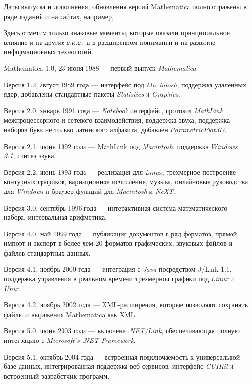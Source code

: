 Даты выпуска и дополнения, обновления версий Mathematica полно отражены в ряде изданий и на сайтах, например, .

Здесь отметим только знаковые моменты, которые оказали принципиальное влияние и на другие \textit{с.к.а.}, а в расширенном понимании и на развитие информационных технологий.
\begin{textitemize}
	\item Mathematica 1.0, 23 июня 1988 --- первый выпуск \textit{Mathematica}.
	\item Версия 1.2, август 1989 года --- интерфейс под \textit{Macintosh}, поддержка удаленных ядер, добавлены стандартные пакеты \textit{Statistics} и \textit{Graphics}.
	\item Версия 2.0, январь 1991 года --- \textit{Notebook} интерфейс, протокол \textit{MathLink} межпроцессорного и сетевого взаимодействия, поддержка звука, поддержка наборов букв не только латинского алфавита, добавлен \textit{ParametricPlot3D}.
	\item Версия 2.1, июнь 1992 года --- MathLink под \textit{Macintosh}, поддержка \textit{Windows 3.1}, синтез звука.
	\item Версия 2.2, июнь 1993 года --- реализация для \textit{Linux}, трехмерное построение контурных графиков, вариационное исчисление, музыка, онлайновые руководства для \textit{Windows} и браузер функций для \textit{Macintosh} и \textit{NeXT}.
	\item Версия 3.0, сентябрь 1996 года --- интерактивная система математического набора, интервальная арифметика.
	\item Версия 4.0, май 1999 года --- публикация документов в ряд форматов, прямой импорт и экспорт в более чем 20 форматов графических, звуковых файлов и файлов стандартных данных.
	\item Версия 4.1, ноябрь 2000 года --- интеграция с \textit{Java} посредством J/Link 1.1, поддержка управления в реальном времени трехмерной графики под \textit{Linux} и \textit{Unix}.
	\item Версия 4.2, ноябрь 2002 года --- XML-расширения, которые позволяют сохранять файлы и выражения Mathematica как XML.
	\item Версия 5.0, июнь 2003 года --- включена \textit{.NET/Link}, обеспечивающая полную интеграцию с \textit{Microsoft’s .NET Framework}.
	\item Версия 5.1, октябрь 2004 года --- встроенная подключаемость к универсальной базе данных, интегрированная поддержка веб-сервисов, интерфейс \textit{GUIKit} и встроенный разработчик программ.

\end{textitemize}
